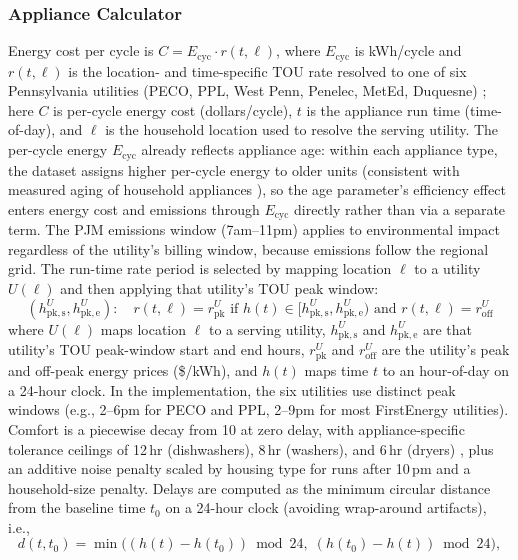 \documentclass[final,3p,times]{elsarticle}
\begin{document}
\subsubsection{Appliance Calculator}
Energy cost per cycle is $C = E_{\mathrm{cyc}} \cdot r(t,\ell)$, where $E_{\mathrm{cyc}}$
is kWh/cycle and $r(t,\ell)$ is the location- and time-specific TOU rate resolved to one of
six Pennsylvania utilities (PECO, PPL, West Penn, Penelec, MetEd, Duquesne) \cite{peco2021};
here $C$ is per-cycle energy cost (dollars/cycle), $t$ is the appliance run time (time-of-day),
and $\ell$ is the household location used to resolve the serving utility. The per-cycle energy
$E_{\mathrm{cyc}}$ already reflects appliance age: within each appliance type, the dataset assigns
higher per-cycle energy to older units (consistent with measured aging of household appliances
\cite{paul2022}), so the age parameter's efficiency effect enters energy cost and emissions
through $E_{\mathrm{cyc}}$ directly rather than via a separate term.
The PJM emissions window (7am--11pm) applies to environmental impact regardless of the
utility's billing window, because emissions follow the regional grid.
The run-time rate period is selected by mapping location $\ell$ to a utility $U(\ell)$ and
then applying that utility's TOU peak window:
\begin{equation}
(h^{U}_{\mathrm{pk,s}}, h^{U}_{\mathrm{pk,e}}):
\quad
r(t,\ell)=r^{U}_{\mathrm{pk}}
\text{ if }
h(t)\in[h^{U}_{\mathrm{pk,s}}, h^{U}_{\mathrm{pk,e}})
\text{ and }
r(t,\ell)=r^{U}_{\mathrm{off}}
\end{equation}
\noindent where $U(\ell)$ maps location $\ell$ to a serving utility, $h^{U}_{\mathrm{pk,s}}$ and $h^{U}_{\mathrm{pk,e}}$
are that utility's TOU peak-window start and end hours, $r^{U}_{\mathrm{pk}}$ and $r^{U}_{\mathrm{off}}$ are the utility's
peak and off-peak energy prices (\$/kWh), and $h(t)$ maps time $t$ to an hour-of-day on a 24-hour clock.
In the implementation, the six utilities use distinct peak windows (e.g., 2--6pm for PECO and
PPL, 2--9pm for most FirstEnergy utilities).
Comfort is a piecewise
decay from 10 at zero delay, with appliance-specific tolerance ceilings of 12\,hr
(dishwashers), 8\,hr (washers), and 6\,hr (dryers) \cite{paetz2012,waseem2020}, plus an
additive noise penalty scaled by housing type for runs after 10\,pm \cite{epa1974noise,epavic2021} and a
household-size penalty.
Delays are computed as the minimum circular distance from the baseline time $t_0$ on a
24-hour clock (avoiding wrap-around artifacts), i.e.,
\begin{equation}
  d(t,t_0)=\min\!\bigl((h(t)-h(t_0))\bmod 24,\; (h(t_0)-h(t))\bmod 24\bigr),
  \label{eq:appliance_delay_circular}
\end{equation}
\end{document}
